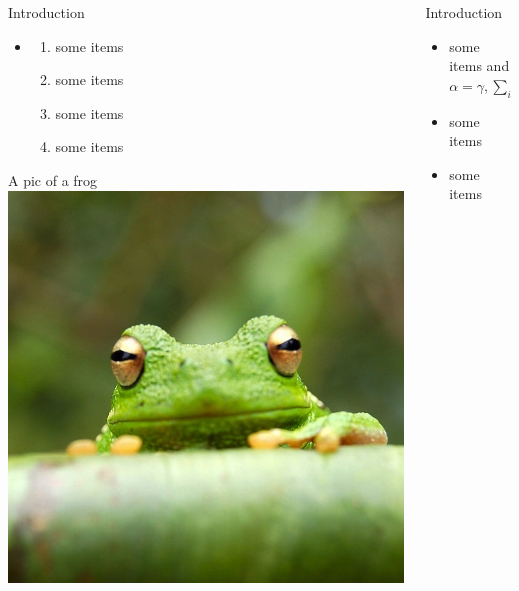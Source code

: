 \documentclass[final]{beamer}
\begin{document}
\begin{frame}{}
\begin{columns}[t]
\begin{column}{.3\linewidth}
\begin{block}{Introduction}
         		\begin{itemize}
          			\item[]
            		\begin{enumerate}
            			\item some items
            			\item some items
            			\item some items
            			\item some items
            		\end{enumerate}    
          		\end{itemize}
        	\end{block}
            \vfill
            \begin{block}{A pic of a frog}
            \centering
            \includegraphics[width=8in]{frog.jpg}
            \end{block}
      \end{column}
      \begin{column}{.3\linewidth}
        	\begin{block}{Introduction}
          		\begin{itemize}
          			\item some items and $\alpha=\gamma, \sum_{i}$
          			\item some items
          			\item some items

\end{itemize}
\end{block}
\end{column}
\end{columns}
\end{frame}
\end{document}
